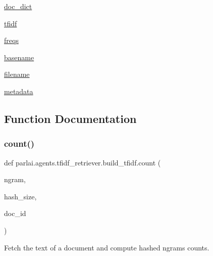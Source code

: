\begin{DoxyCompactItemize}
\hyperlink{namespaceparlai_1_1agents_1_1tfidf__retriever_1_1build__tfidf_a09c3915a9ffe251347f232647caff959}{doc\+\_\+dict}
\item 
\hyperlink{namespaceparlai_1_1agents_1_1tfidf__retriever_1_1build__tfidf_a853d823973f2fcc211470e764e29e3d2}{tfidf}
\item 
\hyperlink{namespaceparlai_1_1agents_1_1tfidf__retriever_1_1build__tfidf_a82fd1621e57caaa8ff7a9c27b0e94125}{freqs}
\item 
\hyperlink{namespaceparlai_1_1agents_1_1tfidf__retriever_1_1build__tfidf_a0a314a0288fcdf731f21e279e9f7b27a}{basename}
\item 
\hyperlink{namespaceparlai_1_1agents_1_1tfidf__retriever_1_1build__tfidf_afcbd4a0d6b9f9e9d88008c66912778cf}{filename}
\item 
\hyperlink{namespaceparlai_1_1agents_1_1tfidf__retriever_1_1build__tfidf_a8c62403fcedaf6bc33fc200088621f86}{metadata}
\end{DoxyCompactItemize}


\subsection{Function Documentation}
\mbox{\label{namespaceparlai_1_1agents_1_1tfidf__retriever_1_1build__tfidf_a7fc352c82f4a875b23fec3b046027039}} 
\subsubsection{\texorpdfstring{count()}{count()}}
{\footnotesize\ttfamily def parlai.\+agents.\+tfidf\+\_\+retriever.\+build\+\_\+tfidf.\+count (\begin{DoxyParamCaption}\item[{}]{ngram,  }\item[{}]{hash\+\_\+size,  }\item[{}]{doc\+\_\+id }\end{DoxyParamCaption})}

\begin{DoxyVerb}Fetch the text of a document and compute hashed ngrams counts.
\end{DoxyVerb}
 

